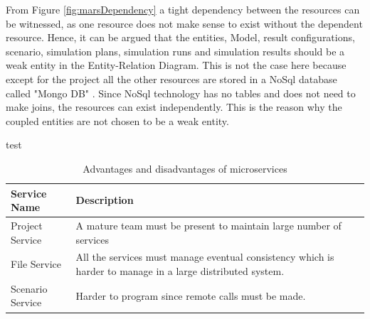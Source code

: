         From Figure \ref{fig:marsDependency} a tight dependency between the resources can be witnessed,  
        as one resource does not make sense to exist without the dependent resource. 
        Hence, it can be argued that the entities, Model, result configurations, scenario, simulation plans, 
        simulation runs and simulation results should be a weak entity in the Entity-Relation Diagram. This is not
        the case here because except for the project all the other resources are stored in a NoSql database
        called "Mongo DB" \cite{MongoDB}. Since NoSql technology has no tables and does not need to make joins,
        the resources can exist independently. This is the reason why the coupled entities are not chosen to 
        be a weak entity.

        \newpage
        test 

        \begin{table}[h!]
            \centering
            \begin{tabular}{|p{3cm}|p{11cm}|}
                \hline
                    \textbf{Service Name}  & \textbf{Description}\\
                \hline
                    Project Service & 
                    A mature team must be present to maintain large number of services \\
                \hline
                    File Service
                    & All the services must manage eventual consistency which is
                    harder to manage in a large distributed system.\\
                \hline
                    Scenario Service  & Harder to program since remote calls must be made.\\
                \hline
            \end{tabular}
            \caption{Advantages and disadvantages of microservices \cite{FowlerMartin}}
            \label{table:Advantages and disadvantages of microservices}     
        \end{table}    
